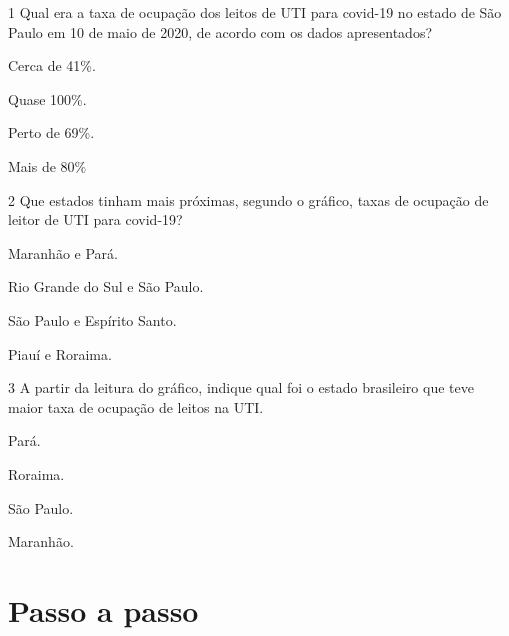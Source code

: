 \num{1} Qual era a taxa de ocupação dos leitos de UTI para covid-19 no estado de São
Paulo em 10 de maio de 2020, de acordo com os dados apresentados?

\begin{minipage}{.5\textwidth}
\begin{escolha}
\item Cerca de 41\%.

\item Quase 100\%.

\item Perto de 69\%.

\item Mais de 80\%
\end{escolha}
\end{minipage}



\num{2} Que estados tinham mais próximas, segundo o gráfico, taxas de ocupação de leitor de UTI para covid-19?

\begin{minipage}{.5\textwidth}
\begin{escolha}
\item Maranhão e Pará.

\item Rio Grande do Sul e São Paulo.

\item São Paulo e Espírito Santo.

\item Piauí e Roraima.
\end{escolha}
\end{minipage}


\pagebreak
\num{3} A partir da leitura do gráfico, indique qual foi o estado brasileiro que teve
maior taxa de ocupação de leitos na UTI.

\begin{minipage}{.5\textwidth}
\begin{escolha}
\item Pará.

\item Roraima.

\item São Paulo.

\item Maranhão.
\end{escolha}
\end{minipage}


\chapter{Passo a passo}

